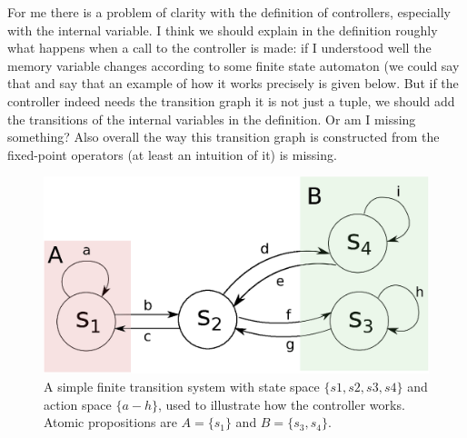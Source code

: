 {\color{purple} For me there is a problem of clarity with the definition of controllers, especially with the internal variable. I think we should explain in the definition roughly what happens when a call to the controller is made: if I understood well the memory variable changes according to some finite state automaton (we could say that and say that an example of how it works precisely is given below. But if the controller indeed needs the transition graph it is not just a tuple, we should add the transitions of the internal variables in the definition. Or am I missing something? Also overall the way this transition graph is constructed from the fixed-point operators (at least an intuition of it) is missing.}


\begin{figure}
	\centering
	\includegraphics[width=0.7\linewidth]{pic/eg1}
	\caption{A simple finite transition system with state space $\{s1,s2,s3,s4\}$ and action space $\{a-h\}$, used to illustrate how the controller works. Atomic propositions are $ A =\{s_1\} $ and $ B=\{s_3, s_4\} $.}
	\label{fig:eg1}
\end{figure}

